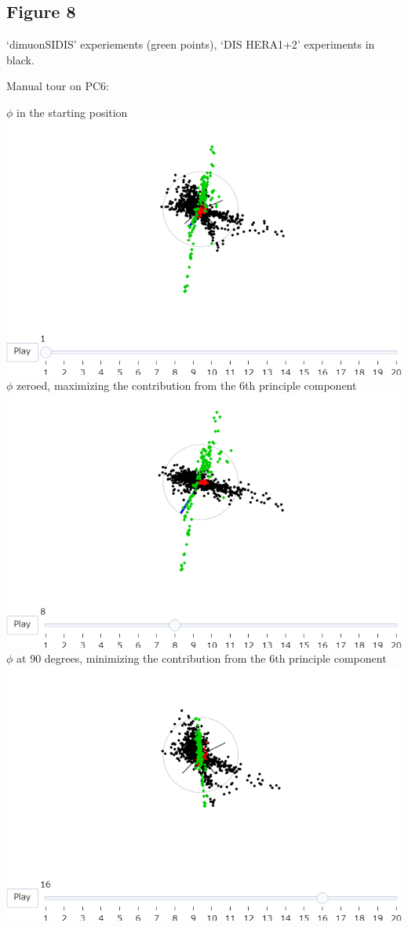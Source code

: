 \documentclass{monashthesis}
\begin{document}
\hypertarget{figure-8}{%
\subsection{Figure 8}\label{figure-8}}

`dimuonSIDIS' experiements (green points), `DIS HERA1+2' experiments in black.

Manual tour on PC6:

\(\phi\) in the starting position
\includegraphics{./output/fig8_phi_start.png}
\(\phi\) zeroed, maximizing the contribution from the 6th principle component
\includegraphics{./output/fig8_phi0.png}
\(\phi\) at 90 degrees, minimizing the contribution from the 6th principle component
\includegraphics{./output/fig8_phi90.png}
\end{document}
